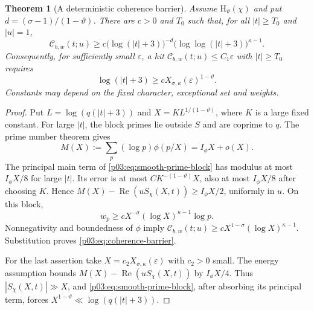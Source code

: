 \documentclass[11pt,letterpaper]{article}
\newtheorem{theorem}{Theorem}[section]
\theoremstyle{definition}
\theoremstyle{remark}
\newcommand{\eps}{\varepsilon}
\renewcommand{\Re}{\operatorname{Re}}
\newcommand{\1}{\mathbf 1}
\begin{document}
\begin{theorem}[A deterministic coherence barrier]\label{p03:thm:coherence-barrier}
Assume $\mathrm H_\vartheta(\chi)$ and put
$d=(\sigma-1)/(1-\vartheta)$. There are $c>0$ and $T_0$ such that,
for all $|t|\ge T_0$ and $|u|=1$,
\begin{equation}\label{p03:eq:coherence-barrier}
 \mathcal C_{b,w}(t;u)\ge
 c\bigl(\log(|t|+3)\bigr)^{-d}
  \bigl(\log\log(|t|+3)\bigr)^{\kappa-1}.
\end{equation}
Consequently, for sufficiently small $\eps$, a hit
$\mathcal C_{b,w}(t;u)\le C_1\eps$ with $|t|\ge T_0$ requires
\begin{equation}\label{p03:eq:coherence-first-height}
 \log(|t|+3)\ge cX_{\sigma,\kappa}(\eps)^{1-\vartheta}.
\end{equation}
Constants may depend on the fixed character, exceptional set and weights.
\end{theorem}
\begin{proof}
Put $L=\log(q(|t|+3))$ and $X=KL^{1/(1-\vartheta)}$, where $K$
is a large fixed constant. For large $|t|$, the block primes lie
outside $S$ and are coprime to $q$. The prime number theorem gives
\[
 M(X):=\sum_p(\log p)\phi(p/X)=I_\phi X+o(X).
\]
The principal main term of \eqref{p03:eq:smooth-prime-block} has modulus
at most $I_\phi X/8$ for large $|t|$. Its error is at most
$CK^{-(1-\vartheta)}X$, also at most $I_\phi X/8$ after choosing
$K$. Hence $M(X)-\Re(uS_\chi(X,t))\ge I_\phi X/2$, uniformly in
$u$. On this block,
\[
 w_p\ge cX^{-\sigma}(\log X)^{\kappa-1}\log p.
\]
Nonnegativity and boundedness of $\phi$ imply
$\mathcal C_{b,w}(t;u)\ge cX^{1-\sigma}(\log X)^{\kappa-1}$.
Substitution proves \eqref{p03:eq:coherence-barrier}.

For the last assertion take $X=c_2X_{\sigma,\kappa}(\eps)$ with
$c_2>0$ small. The energy assumption bounds
$M(X)-\Re(uS_\chi(X,t))$ by $I_\phi X/4$. Thus
$|S_\chi(X,t)|\gg X$, and \eqref{p03:eq:smooth-prime-block}, after
absorbing its principal term, forces
$X^{1-\vartheta}\ll\log(q(|t|+3))$.
\end{proof}
\end{document}
